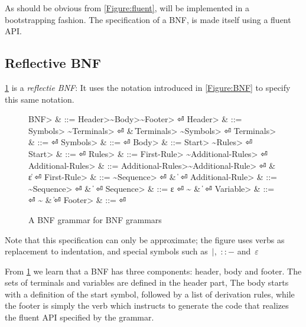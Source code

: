 As should be obvious from \cref{Figure:fluent}, \SELF will be implemented
  in a bootstrapping fashion.
The specification of a BNF, is made itself using a fluent API.

\subsection{Reflective BNF}
\cref{Figure:BNF:BNF} is a \emph{reflectie BNF}:
It uses the notation introduced in \cref{Figure:BNF}
  to specify this same notation.


\begin{figure}[H]
  \begin{Grammar}
    \begin{aligned}
      \<BNF> & ::= \<Header>\~\<Body>\~\<Footer> \hfill⏎
      \<Header> & ::= \<Symbols> \~\<Terminals> \hfill⏎
      {} & \| \<Terminals> \~\<Symbols> \hfill⏎
      \<Terminals> & ::= \hfill⏎
      \<Symbols> & ::= \hfill⏎
      \<Body> & ::= \<Start> \~\<Rules> \hfill⏎
      \<Start> & ::=  \hfill⏎
      \<Rules> & ::= \<First-Rule> \~\<Additional-Rules> \hfill⏎
      \<Additional-Rules> & ::= \<Additional-Rules>\~\<Additional-Rule> \hfill⏎
      {} & \| ε \hfill⏎
      \<First-Rule> & ::= \~\<Sequence> \hfill⏎
      {} & \|  \hfill⏎
      \<Additional-Rule> & ::= \~\<Sequence> \hfill⏎
      {} & \|  \hfill⏎
      \<Sequence> & ::= ε \hfill⏎
      {\~} & \|  \hfill⏎
      \<Variable> & ::=  \hfill⏎
      {\~} & \| \hfill⏎
      \<Footer> & ::= \hfill⏎
    \end{aligned}
  \end{Grammar}
  \caption{A BNF grammar for BNF grammars}
  \label{Figure:BNF:BNF}
\end{figure}

Note that this specification can only be approximate;
  the figure uses verbs as replacement to indentation,
  and special symbols such as~$|$,~$::-$ and~$ε$

From \cref{Figure:BNF:BNF} we learn 
  that a BNF has three components: header, body and footer.
The sets of terminals and variables are defined in the header part, 
The body starts with a definition of the start symbol, followed by a list of derivation
  rules, while the footer is simply the verb  which instructs \SELF
  to generate the code that realizes the fluent API specified by the grammar.

